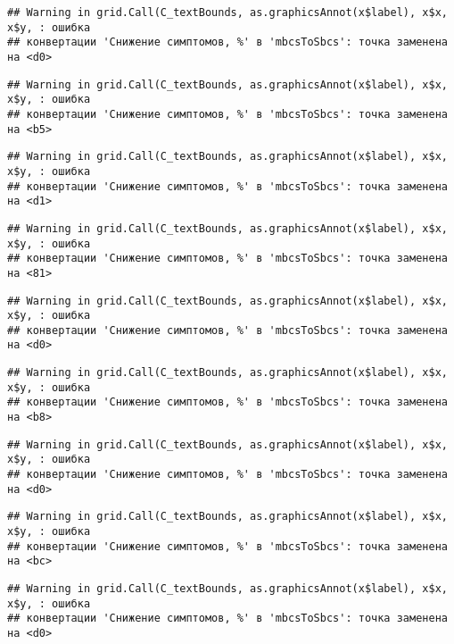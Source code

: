 \documentclass[
]{article}
\begin{document}
\begin{verbatim}
## Warning in grid.Call(C_textBounds, as.graphicsAnnot(x$label), x$x, x$y, : ошибка
## конвертации 'Снижение симптомов, %' в 'mbcsToSbcs': точка заменена на <d0>
\end{verbatim}

\begin{verbatim}
## Warning in grid.Call(C_textBounds, as.graphicsAnnot(x$label), x$x, x$y, : ошибка
## конвертации 'Снижение симптомов, %' в 'mbcsToSbcs': точка заменена на <b5>
\end{verbatim}

\begin{verbatim}
## Warning in grid.Call(C_textBounds, as.graphicsAnnot(x$label), x$x, x$y, : ошибка
## конвертации 'Снижение симптомов, %' в 'mbcsToSbcs': точка заменена на <d1>
\end{verbatim}

\begin{verbatim}
## Warning in grid.Call(C_textBounds, as.graphicsAnnot(x$label), x$x, x$y, : ошибка
## конвертации 'Снижение симптомов, %' в 'mbcsToSbcs': точка заменена на <81>
\end{verbatim}

\begin{verbatim}
## Warning in grid.Call(C_textBounds, as.graphicsAnnot(x$label), x$x, x$y, : ошибка
## конвертации 'Снижение симптомов, %' в 'mbcsToSbcs': точка заменена на <d0>
\end{verbatim}

\begin{verbatim}
## Warning in grid.Call(C_textBounds, as.graphicsAnnot(x$label), x$x, x$y, : ошибка
## конвертации 'Снижение симптомов, %' в 'mbcsToSbcs': точка заменена на <b8>
\end{verbatim}

\begin{verbatim}
## Warning in grid.Call(C_textBounds, as.graphicsAnnot(x$label), x$x, x$y, : ошибка
## конвертации 'Снижение симптомов, %' в 'mbcsToSbcs': точка заменена на <d0>
\end{verbatim}

\begin{verbatim}
## Warning in grid.Call(C_textBounds, as.graphicsAnnot(x$label), x$x, x$y, : ошибка
## конвертации 'Снижение симптомов, %' в 'mbcsToSbcs': точка заменена на <bc>
\end{verbatim}

\begin{verbatim}
## Warning in grid.Call(C_textBounds, as.graphicsAnnot(x$label), x$x, x$y, : ошибка
## конвертации 'Снижение симптомов, %' в 'mbcsToSbcs': точка заменена на <d0>
\end{verbatim}
\end{document}
